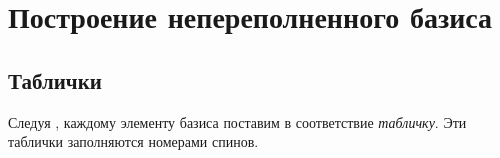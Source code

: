\documentclass[]{article}
\renewcommand{\[}{\begin{equation}}
\renewcommand{\]}{\end{equation}}
\begin{document}



\section{Построение непереполненного базиса}
\subsection{Таблички}
Следуя \cite{sourceArticle}, каждому элементу базиса поставим в соответствие {\it табличку}. Эти таблички заполняются номерами спинов.
\end{document}

